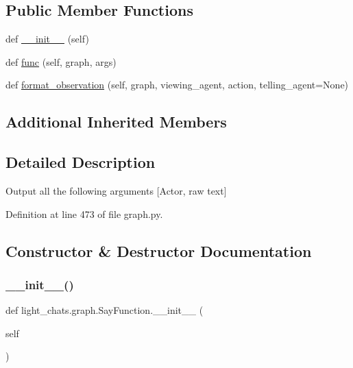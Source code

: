 \subsection*{Public Member Functions}
\begin{DoxyCompactItemize}
\item 
def \hyperlink{classlight__chats_1_1graph_1_1SayFunction_a2d42dde7366558243d4282cab89e9184}{\+\_\+\+\_\+init\+\_\+\+\_\+} (self)
\item 
def \hyperlink{classlight__chats_1_1graph_1_1SayFunction_af14fb1e5a036d9c537ea2915f2c76275}{func} (self, graph, args)
\item 
def \hyperlink{classlight__chats_1_1graph_1_1SayFunction_a20e5908183144f719a93276707938894}{format\+\_\+observation} (self, graph, viewing\+\_\+agent, action, telling\+\_\+agent=None)
\end{DoxyCompactItemize}
\subsection*{Additional Inherited Members}


\subsection{Detailed Description}
\begin{DoxyVerb}Output all the following arguments [Actor, raw text]
\end{DoxyVerb}
 

Definition at line 473 of file graph.\+py.



\subsection{Constructor \& Destructor Documentation}
\mbox{\label{classlight__chats_1_1graph_1_1SayFunction_a2d42dde7366558243d4282cab89e9184}} 
\subsubsection{\texorpdfstring{\+\_\+\+\_\+init\+\_\+\+\_\+()}{\_\_init\_\_()}}
{\footnotesize\ttfamily def light\+\_\+chats.\+graph.\+Say\+Function.\+\_\+\+\_\+init\+\_\+\+\_\+ (\begin{DoxyParamCaption}\item[{}]{self }\end{DoxyParamCaption})}



